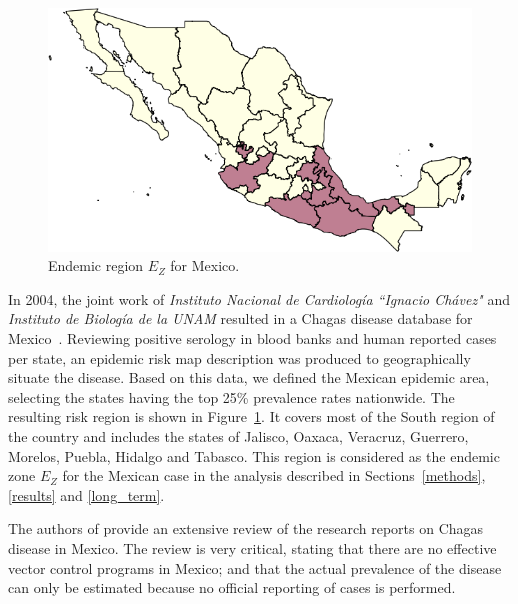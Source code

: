 \begin{figure}[h!]
\centering
\includegraphics[width=0.75\linewidth]
{figures/Ambientes_Gran_Chaco-Mexico1/Ambientes_Gran_Chaco-Mexico1.png}
\caption{Endemic region $E_Z$ for Mexico.}
\label{fig:endemic_zone_mexico}
\end{figure}

In 2004, the joint work of \textit{Instituto Nacional de Cardiología ``Ignacio Chávez"} and  \textit{Instituto de Biología de la UNAM} resulted in a Chagas disease database for Mexico~\cite{cruz2006chagmex}. Reviewing positive serology in blood banks and human reported cases per state, an epidemic risk map description was produced to geographically situate the disease. Based on this data, we defined the Mexican epidemic area, selecting the states having the top 25\% prevalence rates nationwide. The resulting risk region is shown in Figure~\ref{fig:endemic_zone_mexico}. It covers most of the South region of the country and includes the states of Jalisco, Oaxaca, Veracruz, Guerrero, Morelos, Puebla, Hidalgo and Tabasco.
This region is considered as the endemic zone $E_Z$ for the Mexican case in the analysis described in Sections~\ref{methods}, \ref{results} and \ref{long_term}.



The authors of \cite{carabarin2013chagas} provide an extensive review of the 
research reports on Chagas disease in Mexico.
The review is very critical, stating that there are no effective vector control programs in Mexico;
and that the actual prevalence of the disease 
can only be estimated because no official reporting of cases is performed.

